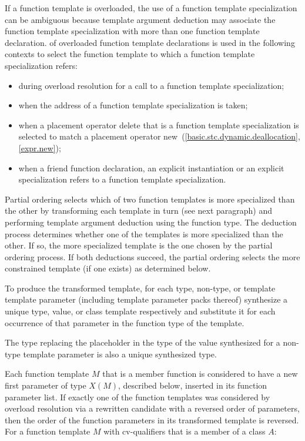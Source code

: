 \pnum
{}%
%
If a function template is overloaded,
the use of a function template specialization can be ambiguous because
template argument deduction may associate the function
template specialization with more than one function template declaration.
of overloaded function template declarations is used in the following contexts
to select the function template to which a function template specialization
refers:
\begin{itemize}
\item
during overload resolution for a call to a function template specialization;
\item
when the address of a function template specialization is taken;
\item
when a placement operator delete that is a
function template
specialization
is selected to match a placement operator new~(\ref{basic.stc.dynamic.deallocation}, \ref{expr.new});
\item
when a friend function declaration, an
explicit instantiation or an explicit specialization refers to
a function template specialization.
\end{itemize}

\pnum
Partial ordering selects which of two function templates is more
specialized than the other by transforming each template in turn
(see next paragraph) and performing template argument deduction
using the function type.
The deduction process determines whether
one of the templates is more specialized than the other. If so, the
more specialized template is the one chosen by the partial ordering
process.
If both deductions succeed, the partial ordering selects
the more constrained template (if one exists) as determined below.

\pnum
To produce the transformed template, for each type, non-type, or template
template parameter (including template parameter packs
thereof) synthesize a unique type, value, or class template
respectively and substitute it for each occurrence of that parameter
in the function type of the template.
\begin{note}
The type replacing the placeholder
in the type of the value synthesized for a non-type template parameter
is also a unique synthesized type.
\end{note}
Each function template $M$ that is a member function
is considered to have
a new first parameter of type $X(M)$, described below,
inserted in its function parameter list.
If exactly one of the function templates was considered by overload resolution
via a rewritten candidate
with a reversed order of parameters,
then the order of the function parameters in its transformed template
is reversed.
For a function template $M$ with cv-qualifiers \cv{}
that is a member of a class $A$:

